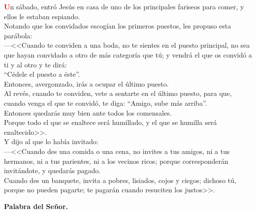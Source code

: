 \documentclass[12pt, letterpaper]{article}
\begin{document}
    \lettrine[lines=2]{\bfseries \textcolor{red}{U}}{}\Large n sábado, entró Jesús en casa de uno de los principales fariseos para comer, y ellos le estaban espiando.\\
    Notando que los convidados escogían los primeros puestos, les propuso esta parábola:\\
    —<<Cuando te conviden a una boda, no te sientes en el puesto principal, no sea que hayan convidado a otro de más categoría que tú; y vendrá el que os convidó a ti y al otro y te dirá:\\
    ``Cédele el puesto a éste''.\\
    Entonces, avergonzado, irás a ocupar el último puesto.\\
    Al revés, cuando te conviden, vete a sentarte en el último puesto, para que, cuando venga el que te convidó, te diga: ``Amigo, sube más arriba''.\\
    Entonces quedarás muy bien ante todos los comensales.\\
    Porque todo el que se enaltece será humillado, y el que se humilla será enaltecido>>.\\
    Y dijo al que lo había invitado:\\
    —<<Cuando des una comida o una cena, no invites a tus amigos, ni a tus hermanos, ni a tus parientes, ni a los vecinos ricos; porque corresponderán invitándote, y quedarás pagado.\\
    Cuando des un banquete, invita a pobres, lisiados, cojos y ciegos; dichoso tú, porque no pueden pagarte; te pagarán cuando resuciten los justos>>.

    {\bfseries Palabra del Se\~nor.}
\end{document}
